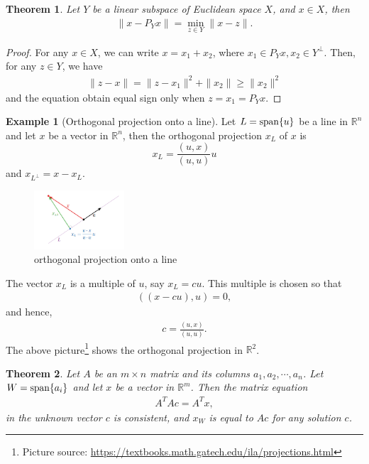 \documentclass[11pt]{book}
\newtheorem{theorem}{Theorem}[section]
\theoremstyle{definition}
\newtheorem{example}{Example}[section]
\numberwithin{equation}{chapter}
\begin{document}
\medskip

\begin{theorem}
Let $Y$ be a linear subspace of Euclidean space $X$, and $x\in X$, then 
\begin{align*}
    \|x - P_Y x\| = \min_{z\in Y} \|x - z\|.
\end{align*}
\end{theorem}
\begin{proof}
For any $x\in X$, we can write $x = x_1 + x_2$, where $x_1\in P_Y x, x_2\in Y^\perp$. Then, for any $z\in Y$, we have
\begin{align*}
    \|z - x\| = \|z - x_1\|^2 + \|x_2\| \geq \|x_2\|^2
\end{align*}
and the equation obtain equal sign only when $z = x_1 = P_Y x$.
\end{proof}

\medskip

\begin{example}[Orthogonal projection onto a line]\label{Orthogonal projection onto a line}
Let $L = {\rm span}\{u\}$ be a line in $\mathbb{R}^n$ and let $x$ be a vector in $\mathbb{R}^n$, then the orthogonal projection $x_L$ of $x$ is $$x_L = \frac{(u,x)}{(u,u)}u$$
and $x_{L^\bot} = x - x_L$.
\begin{figure}[H]
    \centering
    \includegraphics[width=0.3\textwidth]{Orthogonal_projection_1}
    \caption{orthogonal projection onto a line}
    \label{fig:plot_1}
\end{figure}
The vector $x_L$ is a multiple of $u$, say $x_L = cu$. This multiple is chosen so that 
\begin{align*}
    ((x - cu), u) = 0,
\end{align*}
and hence,
\begin{align*}
    c = \frac{(u, x)}{(u, u)}.
\end{align*}
The above picture\footnote{Picture source: \url{https://textbooks.math.gatech.edu/ila/projections.html}} shows the orthogonal projection in $\mathbb{R}^2$.
\end{example}

\medskip

\begin{theorem}
Let $A$ be an $m \times n$ matrix and its columns $a_1, a_2, \cdots, a_n$. Let $W = {\rm span}\{a_i\}$ and let $x$ be a vector in $\mathbb{R}^m$. Then the matrix equation
\begin{align*}
    A^T Ac = A^T x,
\end{align*}
in the unknown vector $c$ is consistent, and $x_W$ is equal to $Ac$ for any solution $c$.
\end{theorem}
\end{document}
